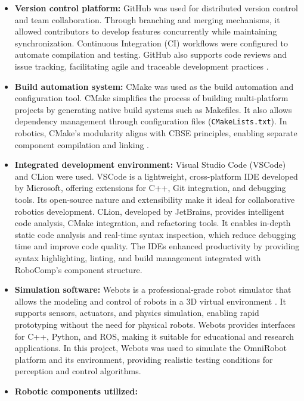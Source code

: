 \documentclass[conference]{IEEEtran}
\begin{document}
\begin{itemize}
    \item \textbf{Version control platform:} GitHub was used for distributed version control and team collaboration. Through branching and merging mechanisms, it allowed contributors to develop features concurrently while maintaining synchronization. Continuous Integration (CI) workflows were configured to automate compilation and testing. GitHub also supports code reviews and issue tracking, facilitating agile and traceable development practices \cite{bird2011github}.
    
    \item \textbf{Build automation system:} CMake was used as the build automation and configuration tool. CMake simplifies the process of building multi-platform projects by generating native build systems such as Makefiles. It also allows dependency management through configuration files (\texttt{CMakeLists.txt}). In robotics, CMake’s modularity aligns with CBSE principles, enabling separate component compilation and linking \cite{hoffman2003cmake}.
    
    \item \textbf{Integrated development environment:} Visual Studio Code (VSCode) and CLion were used. VSCode is a lightweight, cross-platform IDE developed by Microsoft, offering extensions for C++, Git integration, and debugging tools. Its open-source nature and extensibility make it ideal for collaborative robotics development. CLion, developed by JetBrains, provides intelligent code analysis, CMake integration, and refactoring tools. It enables in-depth static code analysis and real-time syntax inspection, which reduce debugging time and improve code quality. The IDEs enhanced productivity by providing syntax highlighting, linting, and build management integrated with RoboComp’s component structure.
    
    \item \textbf{Simulation software:} Webots is a professional-grade robot simulator that allows the modeling and control of robots in a 3D virtual environment \cite{michel2004cyberbotics}. It supports sensors, actuators, and physics simulation, enabling rapid prototyping without the need for physical robots. Webots provides interfaces for C++, Python, and ROS, making it suitable for educational and research applications. In this project, Webots was used to simulate the OmniRobot platform and its environment, providing realistic testing conditions for perception and control algorithms.
    
    \item \textbf{Robotic components utilized:}
    

\end{itemize}
\end{document}
